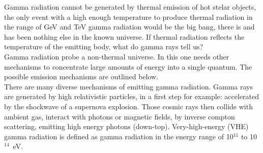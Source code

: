 \documentclass[12pt,article,type=msc,colorback,accentcolor=tud9c]{tudthesis}
\begin{document}

Gamma radiation cannot be generated by thermal emission of hot stelar objects, the only event with a high enough temperature to produce thermal radiation in the range of GeV and TeV gamma radiation would be the big bang, there is and has been nothing else in the known universe. If thermal radiation reflects the temperature of the emitting body, what do gamma rays tell us?\\
Gamma radiation probe a non-thermal universe. In this one needs other mechanisms to concentrate large amounts of energy into a single quantum. The possible emission mechanisms are outlined below.\\
There are many diverse mechanisms of emitting gamma radiation. Gamma rays are generated by high relativistic particles, in a first step for example: accelerated by the shockwave of a supernova explosion. Those cosmic rays then collide with ambient gas, interact with photons or magnetic fields, by inverse compton scattering, emitting high energy photons (down-top). Very-high-energy (VHE) gamma radiation is defined as gamma radiation in the energy range of 10$^{11}$ to 10$^{14}$~eV.\\
\end{document}
